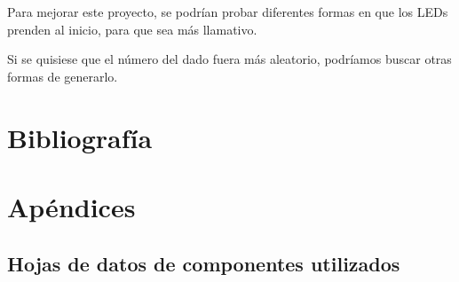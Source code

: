 \documentclass[12pt,a4paper]{article}
\begin{document}
Para mejorar este proyecto, se podrían probar diferentes
formas en que los LEDs prenden al inicio, para que sea más
llamativo.

Si se quisiese que el número del dado fuera más aleatorio,
podríamos buscar otras formas de generarlo.

\section{Bibliografía}



\section{Apéndices}
\subsection{Hojas de datos de componentes utilizados}
% 
% 
% 
\end{document}
